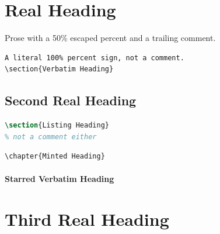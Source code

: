 \documentclass{article}
\begin{document}
\section{Real Heading}

Prose with a 50\% escaped percent and a trailing comment. %

\begin{verbatim}
A literal 100% percent sign, not a comment.
\section{Verbatim Heading}
\end{verbatim}

\subsection{Second Real Heading}

\begin{lstlisting}[language=TeX]
\section{Listing Heading}
% not a comment either
\end{lstlisting}

\begin{verbatim}
\chapter{Minted Heading}
\end{verbatim}

\begin{verbatim*}
\paragraph{Starred Verbatim Heading}
\end{verbatim*}

\section{Third Real Heading}
\end{document}
